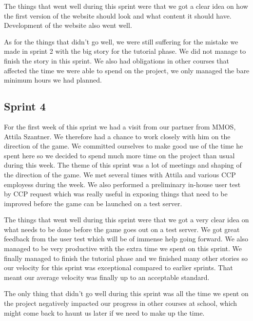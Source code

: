 The things that went well during this sprint were that we got a clear idea on how the first version of the website should look and what content it should have. Development of the website also went well.  

As for the things that didn't go well, we were still suffering for the mistake we made in sprint 2 with the big story for the tutorial phase. We did not manage to finish the story in this sprint. We also had obligations in other courses that affected the time we were able to spend on the project, we only managed the bare minimum hours we had planned. 

\subsection{Sprint 4}

For the first week of this sprint we had a visit from our partner from MMOS, Attila Szantner. We therefore had a chance to work closely with him on the direction of the game. We committed ourselves to make good use of the time he spent here so we decided to spend much more time on the project than usual during this week. The theme of this sprint was a lot of meetings and shaping of the direction of the game. We met several times with Attila and various CCP employess during the week. We also performed a preliminary in-house user test by CCP request which was really useful in exposing things that need to be improved before the game can be launched on a test server.

The things that went well during this sprint were that we got a very clear idea on what needs to be done before the game goes out on a test server. We got great feedback from the user test which will be of immense help going forward. We also managed to be very productive with the extra time we spent on this sprint. We finally managed to finish the tutorial phase and we finished many other stories so our velocity for this sprint was exceptional compared to earlier sprints. That meant our average velocity was finally up to an acceptable standard.

The only thing that didn't go well during this sprint was all the time we spent on the project negatively impacted our progress in other courses at school, which might come back to haunt us later if we need to make up the time.